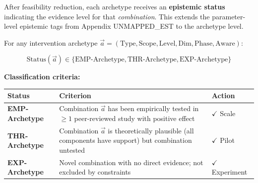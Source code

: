 After feasibility reduction, each archetype receives an \textbf{epistemic status} indicating the evidence level for that \textit{combination}. This extends the parameter-level epistemic tags from Appendix UNMAPPED_EST to the archetype level.

\begin{tcolorbox}[colback=green!5!white, colframe=green!75!black,
    title=\textbf{Definition HHH-D5: Archetype Epistemic Status}]

For any intervention archetype $\vec{a} = (\text{Type}, \text{Scope}, \text{Level}, \text{Dim}, \text{Phase}, \text{Aware})$:

\begin{equation}
\text{Status}(\vec{a}) \in \{\text{EMP-Archetype}, \text{THR-Archetype}, \text{EXP-Archetype}\}
\end{equation}

\textbf{Classification criteria:}

\begin{center}
\renewcommand{\arraystretch}{1.3}
\begin{tabular}{@{}lp{7cm}l@{}}
\toprule
\textbf{Status} & \textbf{Criterion} & \textbf{Action} \\
\midrule
\cellcolor{green!20}\textbf{EMP-Archetype} &
Combination $\vec{a}$ has been empirically tested in $\geq 1$ peer-reviewed study with positive effect &
$\checkmark$ Scale \\
\cellcolor{blue!20}\textbf{THR-Archetype} &
Combination $\vec{a}$ is theoretically plausible (all components have support) but combination untested &
$\checkmark$ Pilot \\
\cellcolor{orange!20}\textbf{EXP-Archetype} &
Novel combination with no direct evidence; not excluded by constraints &
$\checkmark$ Experiment \\
\bottomrule
\end{tabular}
\end{center}

\end{tcolorbox}

